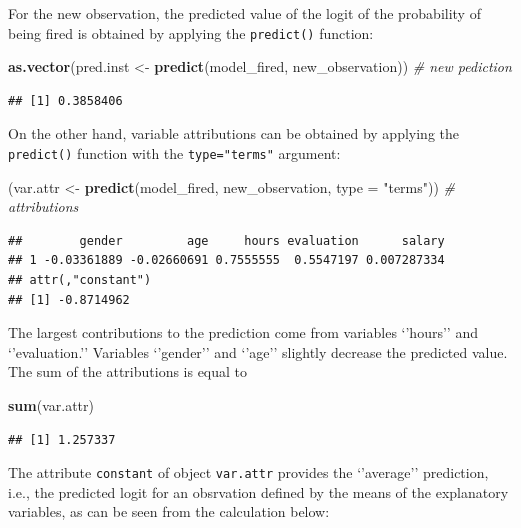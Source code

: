 \documentclass[]{krantz}
\newenvironment{Shaded}{\begin{snugshade}}{\end{snugshade}}
\newcommand{\CommentTok}[1]{\textcolor[rgb]{0.56,0.35,0.01}{\textit{#1}}}
\newcommand{\DataTypeTok}[1]{\textcolor[rgb]{0.13,0.29,0.53}{#1}}
\newcommand{\KeywordTok}[1]{\textcolor[rgb]{0.13,0.29,0.53}{\textbf{#1}}}
\newcommand{\NormalTok}[1]{#1}
\newcommand{\StringTok}[1]{\textcolor[rgb]{0.31,0.60,0.02}{#1}}
\theoremstyle{definition}
\theoremstyle{definition}
\theoremstyle{definition}
\theoremstyle{remark}
\begin{document}
For the new observation, the predicted value of the logit of the
probability of being fired is obtained by applying the
\texttt{predict()} function:

\begin{Shaded}
\begin{Highlighting}[]
\KeywordTok{as.vector}\NormalTok{(pred.inst <-}\StringTok{ }\KeywordTok{predict}\NormalTok{(model_fired, new_observation)) }\CommentTok{# new pediction}
\end{Highlighting}
\end{Shaded}

\begin{verbatim}
## [1] 0.3858406
\end{verbatim}

On the other hand, variable attributions can be obtained by applying the
\texttt{predict()} function with the \texttt{type="terms"} argument:

\begin{Shaded}
\begin{Highlighting}[]
\NormalTok{(var.attr <-}\StringTok{ }\KeywordTok{predict}\NormalTok{(model_fired, new_observation, }\DataTypeTok{type =} \StringTok{"terms"}\NormalTok{)) }\CommentTok{# attributions}
\end{Highlighting}
\end{Shaded}

\begin{verbatim}
##        gender         age     hours evaluation      salary
## 1 -0.03361889 -0.02660691 0.7555555  0.5547197 0.007287334
## attr(,"constant")
## [1] -0.8714962
\end{verbatim}

The largest contributions to the prediction come from variables
`'hours'' and `'evaluation.'' Variables `'gender'' and `'age'' slightly
decrease the predicted value. The sum of the attributions is equal to

\begin{Shaded}
\begin{Highlighting}[]
\KeywordTok{sum}\NormalTok{(var.attr)}
\end{Highlighting}
\end{Shaded}

\begin{verbatim}
## [1] 1.257337
\end{verbatim}

The attribute \texttt{constant} of object \texttt{var.attr} provides the
`'average'' prediction, i.e., the predicted logit for an obsrvation
defined by the means of the explanatory variables, as can be seen from
the calculation below:
\end{document}
